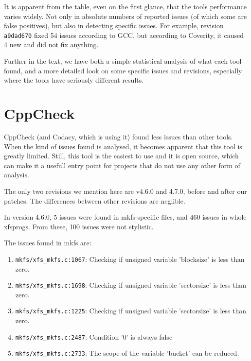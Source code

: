 It is apparent from the table, even on the first glance, that the tools
performance varies widely. Not only in absolute numbers of reported issues (of
which some are false positives), but also in detecting specific issues. For
example, revision {\tt a9dad670} fixed 54 issues according to GCC, but
according to Coverity, it caused 4 new and did not fix anything.

Further in the text, we have both a simple statistical analysis of what each
tool found, and a more detailed look on some specific issues and revisions,
especially where the tools have seriously different results.



\section{CppCheck}\label{chap:results:cppcheck}
CppCheck (and Codacy, which is using it) found less issues than other
tools. When the kind of issues found is analysed, it becomes apparent that
this tool is greatly limited. Still, this tool is the easiest to use and it is
open source, which can make it a usefull entry point for projects that do not
use any other form of analysis.

The only two revisions we mention here are v4.6.0 and 4.7.0, before and after
our patches. The differences between other revisions are neglible.

In version 4.6.0, 5 issues were found in mkfs-specific
files, and 460 issues in whole xfsprogs. From these, 100 issues were not
stylistic.

The issues found in mkfs are:
\begin{enumerate}
	\item {\tt mkfs/xfs\_mkfs.c:1067}: Checking if unsigned variable 'blocksize' is less than zero.
	\item {\tt mkfs/xfs\_mkfs.c:1698}: Checking if unsigned variable
		'sectorsize' is less than zero.
	\item {\tt mkfs/xfs\_mkfs.c:1225}: Checking if unsigned variable
		'sectorsize' is less than zero.
	\item {\tt mkfs/xfs\_mkfs.c:2487}: Condition '0' is always false
	\item {\tt mkfs/xfs\_mkfs.c:2733}: The scope of the variable 'bucket' can be reduced.
\end{enumerate}

